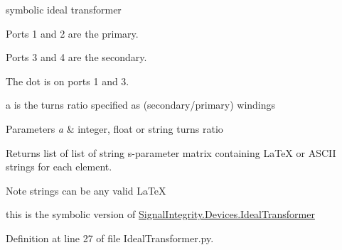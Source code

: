 symbolic ideal transformer 

Ports 1 and 2 are the primary.

Ports 3 and 4 are the secondary.

The dot is on ports 1 and 3.

a is the turns ratio specified as (secondary/primary) windings


\begin{DoxyParams}{Parameters}
{\em a} & integer, float or string turns ratio~\newline
 \\
\hline
\end{DoxyParams}
\begin{DoxyReturn}{Returns}
list of list of string s-\/parameter matrix containing La\+TeX or A\+S\+C\+II strings for each element. 
\end{DoxyReturn}
\begin{DoxyNote}{Note}
strings can be any valid La\+TeX 

this is the symbolic version of \hyperlink{namespaceSignalIntegrity_1_1Devices_1_1IdealTransformer}{Signal\+Integrity.\+Devices.\+Ideal\+Transformer} 
\end{DoxyNote}


Definition at line 27 of file Ideal\+Transformer.\+py.

